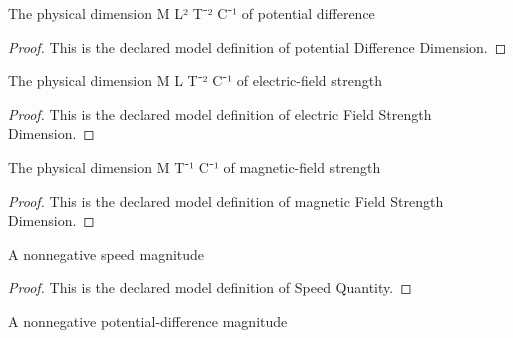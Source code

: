 \begin{definition}
  \label{def:physics:phyx-mini-0640:phyxminiproblems-problemphyxmini0640-potentialdifferencedimension}
  The physical dimension M L² T⁻² C⁻¹ of potential difference
\end{definition}
\begin{proof}
  This is the declared model definition of potential Difference Dimension.
\end{proof}
\begin{definition}
  \label{def:physics:phyx-mini-0640:phyxminiproblems-problemphyxmini0640-electricfieldstrengthdimension}
  The physical dimension M L T⁻² C⁻¹ of electric-field strength
\end{definition}
\begin{proof}
  This is the declared model definition of electric Field Strength Dimension.
\end{proof}
\begin{definition}
  \label{def:physics:phyx-mini-0640:phyxminiproblems-problemphyxmini0640-magneticfieldstrengthdimension}
  The physical dimension M T⁻¹ C⁻¹ of magnetic-field strength
\end{definition}
\begin{proof}
  This is the declared model definition of magnetic Field Strength Dimension.
\end{proof}
\begin{definition}
  \label{def:physics:phyx-mini-0640:phyxminiproblems-problemphyxmini0640-speedquantity}
  A nonnegative speed magnitude
\end{definition}
\begin{proof}
  This is the declared model definition of Speed Quantity.
\end{proof}
\begin{definition}
  \label{def:physics:phyx-mini-0640:phyxminiproblems-problemphyxmini0640-potentialdifferencequantity}
  A nonnegative potential-difference magnitude
\end{definition}
